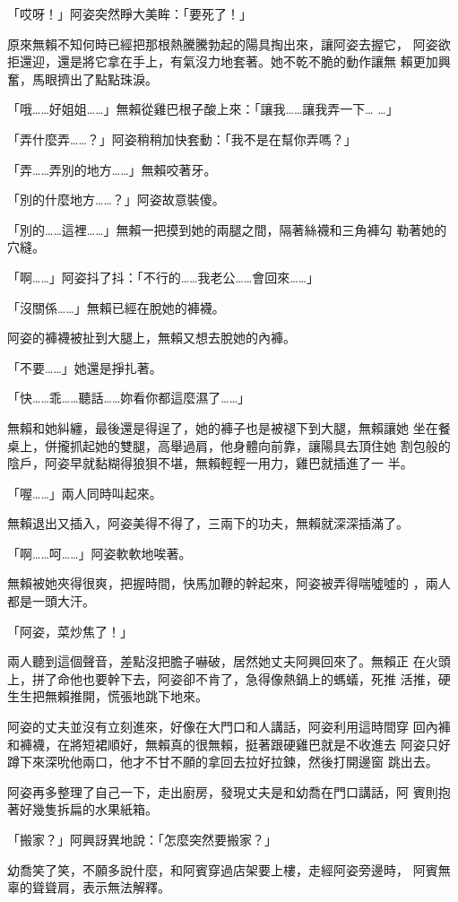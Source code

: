 「哎呀！」阿姿突然睜大美眸：「要死了！」

原來無賴不知何時已經把那根熱騰騰勃起的陽具掏出來，讓阿姿去握它，
阿姿欲拒還迎，還是將它拿在手上，有氣沒力地套著。她不乾不脆的動作讓無
賴更加興奮，馬眼擠出了點點珠淚。

「哦……好姐姐……」無賴從雞巴根子酸上來：「讓我……讓我弄一下…
…」

「弄什麼弄……？」阿姿稍稍加快套動：「我不是在幫你弄嗎？」

「弄……弄別的地方……」無賴咬著牙。

「別的什麼地方……？」阿姿故意裝傻。

「別的……這裡……」無賴一把摸到她的兩腿之間，隔著絲襪和三角褲勾
勒著她的穴縫。

「啊……」阿姿抖了抖：「不行的……我老公……會回來……」

「沒關係……」無賴已經在脫她的褲襪。

阿姿的褲襪被扯到大腿上，無賴又想去脫她的內褲。

「不要……」她還是掙扎著。

「快……乖……聽話……妳看你都這麼濕了……」

無賴和她糾纏，最後還是得逞了，她的褲子也是被褪下到大腿，無賴讓她
坐在餐桌上，併攏抓起她的雙腿，高舉過肩，他身體向前靠，讓陽具去頂住她
割包般的陰戶，阿姿早就黏糊得狼狽不堪，無賴輕輕一用力，雞巴就插進了一
半。

「喔……」兩人同時叫起來。

無賴退出又插入，阿姿美得不得了，三兩下的功夫，無賴就深深插滿了。

「啊……呵……」阿姿軟軟地唉著。

無賴被她夾得很爽，把握時間，快馬加鞭的幹起來，阿姿被弄得喘噓噓的
，兩人都是一頭大汗。

「阿姿，菜炒焦了！」

兩人聽到這個聲音，差點沒把膽子嚇破，居然她丈夫阿興回來了。無賴正
在火頭上，拼了命他也要幹下去，阿姿卻不肯了，急得像熱鍋上的螞蟻，死推
活推，硬生生把無賴推開，慌張地跳下地來。

阿姿的丈夫並沒有立刻進來，好像在大門口和人講話，阿姿利用這時間穿
回內褲和褲襪，在將短裙順好，無賴真的很無賴，挺著跟硬雞巴就是不收進去
阿姿只好蹲下來深吮他兩口，他才不甘不願的拿回去拉好拉鍊，然後打開邊窗
跳出去。

阿姿再多整理了自己一下，走出廚房，發現丈夫是和幼喬在門口講話，阿
賓則抱著好幾隻拆扁的水果紙箱。

「搬家？」阿興訝異地說：「怎麼突然要搬家？」

幼喬笑了笑，不願多說什麼，和阿賓穿過店架要上樓，走經阿姿旁邊時，
阿賓無辜的聳聳肩，表示無法解釋。


